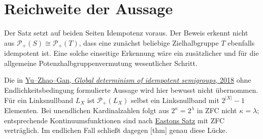 \documentclass[main.tex]{subfiles}
\begin{document}
\section{Reichweite der Aussage}

\begin{remark}
Der Satz setzt auf beiden Seiten Idempotenz voraus.  Der Beweis erkennt
nicht aus \(\mathcal P_+(S)\cong\mathcal P_+(T)\), dass eine zunächst
beliebige Zielhalbgruppe \(T\) ebenfalls idempotent ist.  Eine solche
einseitige Erkennung wäre ein zusätzlicher und für die allgemeine
Potenzhalbgruppenvermutung wesentlicher Schritt.

Die in
\href{https://doi.org/10.1080/00927872.2017.1319474}%
 {Yu--Zhao--Gan, \emph{Global determinism of idempotent semigroups}, 2018}
ohne Endlichkeitsbedingung formulierte Aussage wird hier bewusst nicht
übernommen.  Für ein Linksnullband \(L_X\) ist
\(\mathcal P_+(L_X)\) selbst ein Linksnullband mit
\(2^{|X|}-1\) Elementen.  Bei unendlichen Kardinalzahlen folgt aus
\(2^\kappa=2^\lambda\) in ZFC nicht \(\kappa=\lambda\); entsprechende
Kontinuumsfunktionen sind nach
\href{https://doi.org/10.1016/0003-4843(70)90012-4}%
 {Eastons Satz}
mit ZFC verträglich.  Im endlichen Fall schließt dagegen
[thm]
genau diese Lücke.
\end{remark}
\end{document}
